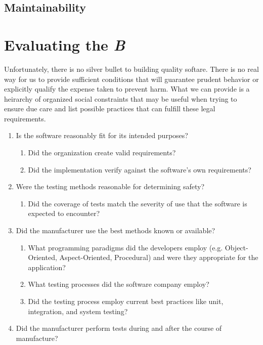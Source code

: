 \subsection{Maintainability}

\section{Evaluating the \textit{B}}

Unfortunately, there is no silver bullet \cite{Brooks87} to building quality
softare. There is no real way for us to provide sufficient conditions that will
guarantee prudent behavior or explicitly qualify the expense taken to prevent
harm. What we can provide is a heirarchy of organized social constraints that
may be useful when trying to ensure due care and list possible practices that
can fulfill these legal requirements.

\singlespace
\begin{enumerate}
  \item Is the software reasonably fit for its intended purposes?
  \begin{enumerate}
    \item Did the organization create valid requirements?
    \item Did the implementation verify against the software's own requirements?
  \end{enumerate}
  \item Were the testing methods reasonable for determining safety?
    \begin{enumerate}
    \item Did the coverage of tests match the severity of use that the
    software is expected to encounter?
    \end{enumerate}
  \item Did the manufacturer use the best methods known or available?
    \begin{enumerate}
      \item What programming paradigms did the developers employ (e.g.
      Object-Oriented, Aspect-Oriented, Procedural) and were they appropriate
      for the application?
      \item What testing processes did the software company employ?
      \item Did the testing process employ current best practices like unit,
      integration, and system testing?
    \end{enumerate}
  \item Did the manufacturer perform tests during and after the course of
  manufacture? 
\end{enumerate}
\doublespace

